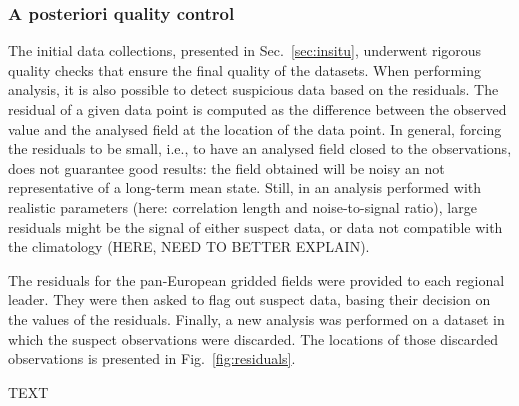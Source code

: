 \documentclass[essd, manuscript]{copernicus}
\begin{document}
\subsubsection{A posteriori quality control}

The initial data collections, presented in Sec.~\ref{sec:insitu}, underwent rigorous quality checks that ensure the final quality of the datasets. When performing analysis, it is also possible to detect suspicious data based on the residuals. The residual of a given data point is computed as the difference between the observed value and the analysed field at the location of the data point. In general, forcing the residuals to be small, i.e., to have an analysed field closed to the observations, does not guarantee good results: the field obtained will be noisy an not representative of a long-term mean state. Still, in an analysis performed with realistic parameters (here: correlation length and noise-to-signal ratio), large residuals might be the signal of either suspect data, or data not compatible with the climatology (HERE, NEED TO BETTER EXPLAIN).

The residuals for the pan-European gridded fields were provided to each regional leader. They were then asked to flag out suspect data, basing their decision on the values of the residuals. Finally, a new analysis was performed on a dataset in which the suspect observations were discarded. The locations of those discarded observations is presented in Fig.~\ref{fig:residuals}. 



\conclusions  %
TEXT






\end{document}
